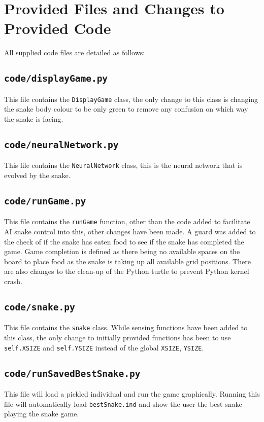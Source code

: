 \appendix

\section{Provided Files and Changes to Provided Code}
\label{appendix:a}
All supplied code files are detailed as follows:

\subsection{\texttt{code/displayGame.py}}
This file contains the \verb|DisplayGame| class, the only change to this class is changing the snake body colour to be only green to remove any confusion on which way the snake is facing.
\subsection{\texttt{code/neuralNetwork.py}}
This file contains the \verb|NeuralNetwork| class, this is the neural network that is evolved by the snake.
\subsection{\texttt{code/runGame.py}}
This file contains the \verb|runGame| function, other than the code added to facilitate AI snake control into this, other changes have been made. A guard was added to the check of if the snake has eaten food to see if the snake has completed the game. Game completion is defined as there being no available spaces on the board to place food as the snake is taking up all available grid positions. There are also changes to the clean-up of the Python turtle to prevent Python kernel crash. 
\subsection{\texttt{code/snake.py}}
This file contains the \verb|snake| class. While sensing functions have been added to this class, the only change to initially provided functions has been to use \verb|self.XSIZE| and \verb|self.YSIZE| instead of the global \verb|XSIZE|, \verb|YSIZE|.
\subsection{\texttt{code/runSavedBestSnake.py}}
This file will load a pickled individual and run the game graphically. Running this file will automatically load \texttt{bestSnake.ind} and show the user the best snake playing the snake game.

